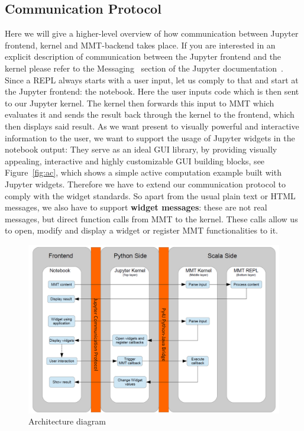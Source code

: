 \subsection{Communication Protocol}
Here we will give a higher-level overview of how communication between Jupyter frontend, kernel and MMT-backend takes place.
If you are interested in an explicit description of communication between the Jupyter frontend and the kernel please refer to the Messaging~\cite{JupMessaging:on} section of the Jupyter documentation~\cite{JupDocumentation:on}.
Since a REPL always starts with a user input, let us comply to that and start at the Jupyter frontend: the notebook.
Here the user inputs code which is then sent to our Jupyter kernel.
The kernel then forwards this input to MMT which evaluates it and sends the result back through the kernel to the frontend, which then displays said result.
As we want present to visually powerful and interactive information to the user, we want to support the usage of Jupyter widgets in the notebook output:
They serve as an ideal GUI library, by providing visually appealing, interactive and highly customizable GUI building blocks, see Figure~\ref{fig:ac}, which shows a simple active computation example built with Jupyter widgets.
Therefore we have to extend our communication protocol to comply with the widget standards. So apart from the usual plain text or HTML messages, we also have to support \textbf{widget messages}: these are not real messages, but direct function calls from MMT to the kernel. These calls allow us to open, modify and display a widget or register MMT functionalities to it.
\begin{figure}[ht]\centering
  \includegraphics[width=12cm]{ArchitectureDiagram}
  \caption{Architecture diagram}\label{fig:architecture-diagram}
\end{figure}
